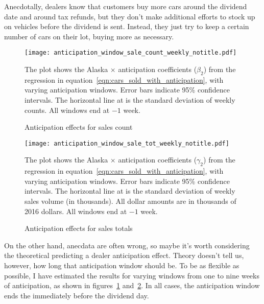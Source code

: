 \documentclass[11pt,letterpaper,oneside]{article}
\newcommand{\snippet}[1]{\hspace{-0.15em}}
\begin{document}
Anecdotally, dealers know that customers buy more cars around the dividend date and around tax refunds, but they don't make additional efforts to stock up on vehicles before the dividend is sent.
Instead, they just try to keep a certain number of cars on their lot, buying more as necessary.

\begin{figure}[hbt]
    \caption{Anticipation effects for sales count}
    \label{fig:anticipation_window_sale_count}
    \texttt{[image: anticipation\_window\_sale\_count\_weekly\_notitle.pdf]}

    {\footnotesize
    The plot shows the Alaska $\times$ anticipation coefficients ($\beta_2$) from the regression in equation~\ref{eqn:cars_sold_with_anticipation}, with varying anticipation windows.
    Error bars indicate 95\% confidence intervals.
    The horizontal line at \snippet{sales_count_weekly_std_dev.tex} is the standard deviation of weekly counts.
    All windows end at $-1$ week.
    }

\end{figure}
\begin{figure}[hbt]
     \caption{Anticipation effects for sales totals}
     \label{fig:anticipation_window_sale_tot}
        \texttt{[image: anticipation\_window\_sale\_tot\_weekly\_notitle.pdf]}

    {\footnotesize
    The plot shows the Alaska $\times$ anticipation coefficients ($\gamma_2$) from the regression in equation~\ref{eqn:cars_sold_with_anticipation}, with varying anticipation windows.
    Error bars indicate 95\% confidence intervals.
    The horizontal line at \snippet{sales_tot_weekly_thousands_std_dev.tex} is the standard deviation of weekly sales volume (in thousands).
    All dollar amounts are in thousands of 2016 dollars.
    All windows end at $-1$ week.
    }
\end{figure}


On the other hand, anecdata are often wrong, so maybe it's worth considering the theoretical predicting a dealer anticipation effect.
Theory doesn't tell us, however, how long that anticipation window should be.
To be as flexible as possible, I have estimated the results for varying windows from one to nine weeks of anticipation, as shown in figures~\ref{fig:anticipation_window_sale_count} and~\ref{fig:anticipation_window_sale_tot}.
In all cases, the anticipation window ends the immediately before the dividend day.
\end{document}
